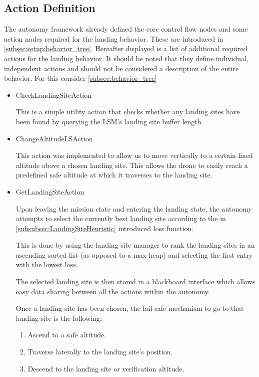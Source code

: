 \subsection{Action Definition}\label{subsec:actn_def}

The autonomy framework already defined the core control flow nodes and some action nodes required for the landing behavior. These are introduced in \cref{subsec:setup:behavior_tree}. Hereafter displayed is a list of additional required actions for the landing behavior. It should be noted that they define individual, independent actions and should not be considered a description of the entire behavior. For this consider \cref{subsec:behavior_tree}

\begin{itemize}
    \item CheckLandingSiteAction

    This is a simple utility action that checks whether any landing sites have been found by querying the LSM's landing site buffer length.
    \item ChangeAltitudeLSAction

    This action was implemented to allow us to move vertically to a certain fixed altitude above a chosen landing site. This allows the drone to easily reach a predefined safe altitude at which it traverses to the landing site.
    \item GetLandingSiteAction

    Upon leaving the mission state and entering the landing state, the autonomy attempts to select the currently best landing site according to the in \cref{subsubsec:LandingSiteHeuristic} introduced loss function.

    This is done by using the landing site manager to rank the landing sites in an ascending sorted list (as opposed to a max-heap) and selecting the first entry with the lowest loss.

    The selected landing site is then stored in a blackboard interface which allows easy data sharing between all the actions within the autonomy.

    Once a landing site has been chosen, the fail-safe mechanism to go to that landing site is the following:

    \begin{enumerate}
        \item Ascend to a safe altitude.
        \item Traverse laterally to the landing site's position.
        \item Descend to the landing site or verification altitude.
    \end{enumerate}


\end{itemize}

